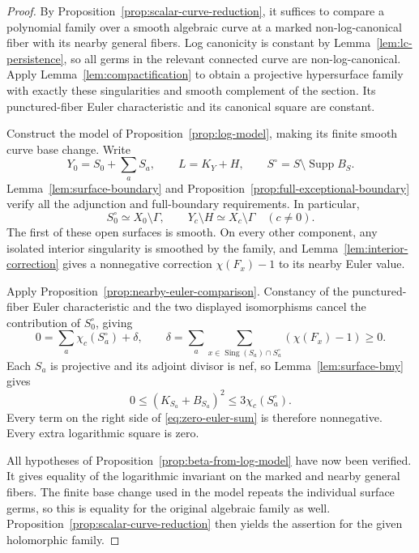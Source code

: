 \begin{proof}
By Proposition~\ref{prop:scalar-curve-reduction}, it suffices to compare
a polynomial family over a smooth algebraic curve at a marked non-log-canonical
fiber with its nearby general fibers.  Log canonicity is constant by
Lemma~\ref{lem:lc-persistence}, so all germs in the relevant connected
curve are non-log-canonical.  Apply Lemma~\ref{lem:compactification} to
obtain a projective hypersurface family with exactly these singularities
and smooth complement of the section.  Its punctured-fiber Euler
characteristic and its canonical square are constant.

Construct the model of Proposition~\ref{prop:log-model}, making its finite
smooth curve base change.  Write
\[
 Y_0=S_0+\sum_a S_a,\qquad L=K_Y+H,
 \qquad S^\circ=S\setminus\operatorname{Supp}B_S.
\]
Lemma~\ref{lem:surface-boundary} and
Proposition~\ref{prop:full-exceptional-boundary} verify all the
adjunction and full-boundary requirements.  In particular,
\[
 S_0^\circ\simeq X_0\setminus\Gamma,
 \qquad Y_c\setminus H\simeq X_c\setminus\Gamma\quad(c\ne0).
\]
The first of these open surfaces is smooth.  On every other component,
any isolated interior singularity is smoothed by the family, and
Lemma~\ref{lem:interior-correction} gives a nonnegative correction
$\chi(F_x)-1$ to its nearby Euler value.

Apply Proposition~\ref{prop:nearby-euler-comparison}.  Constancy of the
punctured-fiber Euler characteristic and the two displayed isomorphisms
cancel the contribution of $S_0^\circ$, giving
\begin{equation}\label{eq:zero-euler-sum}
 0=\sum_a\chi_c(S_a^\circ)+\delta,
 \qquad
 \delta=\sum_a\sum_{x\in\operatorname{Sing}(S_a)\cap S_a^\circ}
                  (\chi(F_x)-1)\ge0.
\end{equation}
Each $S_a$ is projective and its adjoint divisor is nef, so
Lemma~\ref{lem:surface-bmy} gives
\[
 0\le(K_{S_a}+B_{S_a})^2\le3\chi_c(S_a^\circ).
\]
Every term on the right side of \eqref{eq:zero-euler-sum} is therefore
nonnegative.  Every extra logarithmic square is zero.

All hypotheses of Proposition~\ref{prop:beta-from-log-model} have now
been verified.  It gives equality of the logarithmic invariant on the
marked and nearby general fibers.  The finite base change used in the
model repeats the individual surface germs, so this is equality for
the original algebraic family as well.  Proposition~\ref{prop:scalar-curve-reduction}
then yields the assertion for the given holomorphic family.
\end{proof}
